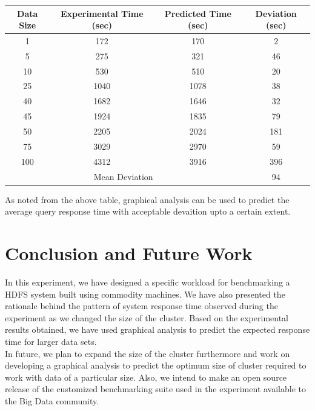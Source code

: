 \documentclass[12pt]{book}
\begin{document}
\begin{center}
\label{4tab}
\begin{tabular}{|c|c|c|c|}\hline
Data Size & Experimental Time (sec) & Predicted Time (sec) & Deviation (sec) \\\hline
1 & 172 & 170 & 2\\
5 & 275 & 321 & 46\\
10 & 530 & 510 & 20\\
25 & 1040 & 1078 & 38\\
40 & 1682 & 1646 & 32\\
45 & 1924 & 1835 & 79\\
50 & 2205 & 2024 & 181\\
75 & 3029 & 2970 & 59\\
100 & 4312 & 3916 & 396\\\hline
\multicolumn{3}{|c|}{Mean Deviation} & 94\\\hline
\end{tabular}
\end{center}
\noindent
As noted from the above table, graphical analysis can be used to predict the average query response time with acceptable devaition
upto a certain extent.


\chapter{Conclusion and Future Work}
In this experiment, we have designed a specific workload for benchmarking a HDFS system built using commodity machines. 
We have also presented the rationale behind the pattern of system response time observed during the experiment as we changed the size of 
the cluster. Based on the experimental results obtained, we have used graphical analysis to predict the expected response time for larger 
data sets. 
\\\noindent
\newline\noindent
In future, we plan to expand the size of the cluster furthermore and work on developing a graphical analysis to predict the optimum size of 
cluster required to work with data of a particular size. Also, we intend to make an open source release of the customized benchmarking suite 
used in the experiment available to the Big Data community.


\end{document}
